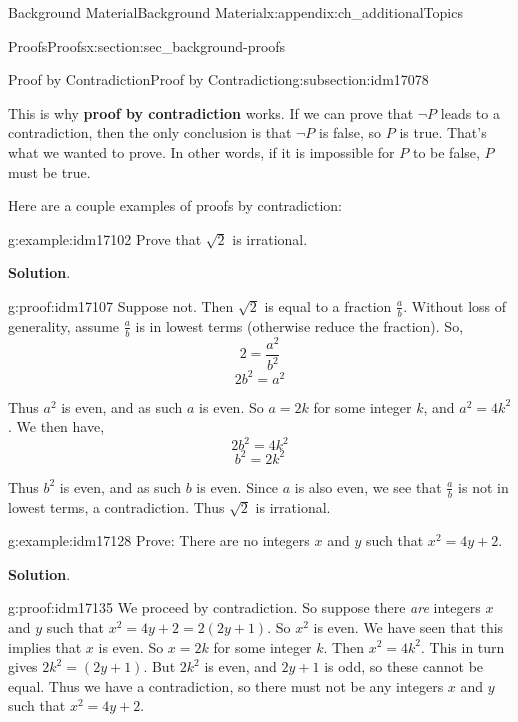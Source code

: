 \documentclass[oneside,10pt,]{book}
\newcommand{\terminology}[1]{\textbf{#1}}
\numberwithin{equation}{chapter}
\begin{document}
\begin{appendixptx}{Background Material}{}{Background Material}{}{}{x:appendix:ch_additionalTopics}
\begin{sectionptx}{Proofs}{}{Proofs}{}{}{x:section:sec_background-proofs}
\begin{subsectionptx}{Proof by Contradiction}{}{Proof by Contradiction}{}{}{g:subsection:idm17078}
\par
This is why \terminology{proof by contradiction} works. If we can prove that \(\neg P\) leads to a contradiction, then the only conclusion is that \(\neg P\) is false, so \(P\) is true. That's what we wanted to prove. In other words, if it is impossible for \(P\) to be false, \(P\) must be true.%
\par
Here are a couple examples of proofs by contradiction:%
\begin{example}{}{g:example:idm17102}%
Prove that \(\sqrt{2}\) is irrational.%
\par\smallskip%
\noindent\textbf{Solution}.\hypertarget{g:solution:idm17106}{}\quad{}\begin{proofptx}{}{g:proof:idm17107}
Suppose not. Then \(\sqrt 2\) is equal to a fraction \(\frac{a}{b}\). Without loss of generality, assume \(\frac{a}{b}\) is in lowest terms (otherwise reduce the fraction). So,%
\begin{equation*}
2 = \frac{a^2}{b^2}
\end{equation*}
%
\begin{equation*}
2b^2 = a^2
\end{equation*}
%
\par
Thus \(a^2\) is even, and as such \(a\) is even. So \(a = 2k\) for some integer \(k\), and \(a^2 = 4k^2\). We then have,%
\begin{equation*}
2b^2 = 4k^2
\end{equation*}
%
\begin{equation*}
b^2 = 2k^2
\end{equation*}
%
\par
Thus \(b^2\) is even, and as such \(b\) is even. Since \(a\) is also even, we see that \(\frac{a}{b}\) is not in lowest terms, a contradiction. Thus \(\sqrt 2\) is irrational.%
\end{proofptx}
\end{example}
\begin{example}{}{g:example:idm17128}%
Prove: There are no integers \(x\) and \(y\) such that \(x^2  = 4y + 2\).%
\par\smallskip%
\noindent\textbf{Solution}.\hypertarget{g:solution:idm17134}{}\quad{}\begin{proofptx}{}{g:proof:idm17135}
We proceed by contradiction. So suppose there \emph{are} integers \(x\) and \(y\) such that \(x^2 = 4y + 2 = 2(2y + 1)\). So \(x^2\) is even. We have seen that this implies that \(x\) is even. So \(x = 2k\) for some integer \(k\). Then \(x^2 = 4k^2\). This in turn gives \(2k^2 = (2y + 1)\). But \(2k^2\) is even, and \(2y + 1\) is odd, so these cannot be equal. Thus we have a contradiction, so there must not be any integers \(x\) and \(y\) such that \(x^2 = 4y + 2\).%

\end{proofptx}
\end{example}
\end{subsectionptx}
\end{sectionptx}
\end{appendixptx}
\end{document}
